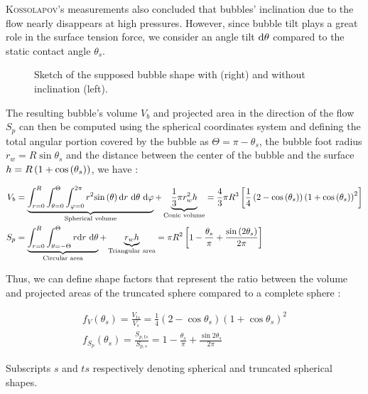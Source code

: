 \textsc{Kossolapov}'s measurements also concluded that bubbles' inclination due to the flow nearly disappears at high pressures. However, since bubble tilt plays a great role in the surface tension force, we consider an angle tilt $\mathrm{d}\theta$ compared to the static contact angle $\theta_{s}$.

\begin{figure}[h!]
\centering

\caption{Sketch of the supposed bubble shape with (right) and without inclination (left).}
\label{fig:bub_shape}

\end{figure}



The resulting bubble's volume $V_{b}$ and projected area in the direction of the flow $S_{p}$ can then be computed using the spherical coordinates system and defining the total angular portion covered by the bubble as $\Theta = \pi - \theta_{s}$, the bubble foot radius $r_{w}=R \sin{\theta_{s}}$ and the distance between the center of the bubble and the surface $h=R\left( 1+\mathrm{cos}\left( \theta_{s} \right) \right)$, we have :

\begin{align}
V_{b} &= \underbrace{ \int_{r=0}^{R} \int_{\theta=0}^{\Theta} \int_{\varphi=0}^{2\pi} r^{2}\mathrm{sin}\left( \theta \right) \text{d}r ~\text{d}\theta~ \text{d}\varphi }_{\text{Spherical volume}}+ \underbrace {\frac{1}{3}\pi r_{w}^{2}h}_{\text{Conic volume}}
=\frac{4}{3}\pi R^{3} \left[  \frac{1}{4} \left( 2-\mathrm{cos}\left( \theta_{s} \right) \right)\left( 1+\mathrm{cos}\left( \theta_{s} \right) \right)^{2}  \right] \\
S_{p}&= \underbrace{\int_{r=0}^{R}\int_{\theta=-\Theta}^{\Theta}r \text{d}r ~ \text{d}\theta}_{\text{Circular area}} + \underbrace{r_{w}h}_{\text{Triangular area}} = \pi R^{2} \left[ 1-\frac{\theta_{s}}{\pi} + \frac{\mathrm{sin}\left( 2\theta_{s} \right)}{2\pi}  \right] 
\end{align}


Thus, we can define shape factors that represent the ratio between the volume and projected areas of the truncated sphere compared to a complete sphere : 

\begin{align}
f_{V}\left(\theta_{s}\right)=\frac{V_{ts}}{V_{s}}=\frac{1}{4}\left(2-\cos{\theta_{s}}\right)\left(1+\cos{\theta_{s}}\right)^{2}\\
f_{S_{p}}\left(\theta_{s}\right)=\frac{S_{p,ts}}{S_{p,s}}=1-\frac{\theta_{s}}{\pi}+\frac{\sin{2\theta_{s}}}{2\pi}
\end{align}

Subscripts $s$ and $ts$ respectively denoting spherical and truncated spherical shapes.


